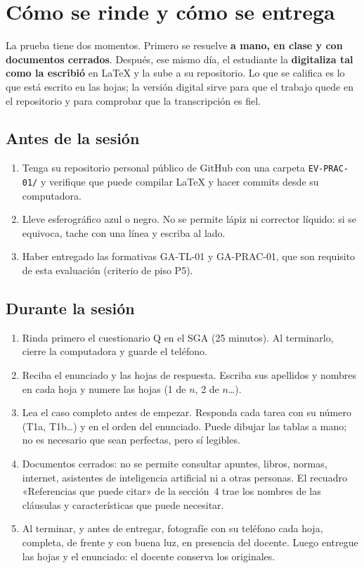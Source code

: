 \documentclass[11pt]{article}
\newcommand{\seccion}[1]{\section{\textcolor{utegreendk}{#1}}}
\newcommand{\subseccion}[1]{\subsection{\textcolor{midblue}{#1}}}
\begin{document}
\seccion{Cómo se rinde y cómo se entrega}

La prueba tiene dos momentos. Primero se resuelve \textbf{a mano, en clase y con documentos cerrados}. Después, ese mismo día, el estudiante la \textbf{digitaliza tal como la escribió} en \LaTeX{} y la sube a su repositorio. Lo que se califica es lo que está escrito en las hojas; la versión digital sirve para que el trabajo quede en el repositorio y para comprobar que la transcripción es fiel.

\subseccion{Antes de la sesión}

\begin{enumerate}[leftmargin=18pt,itemsep=2pt]
	\item Tenga su repositorio personal público de GitHub con una carpeta \texttt{EV-PRAC-01/} y verifique que puede compilar \LaTeX{} y hacer commits desde su computadora.
	\item Lleve esferográfico azul o negro. No se permite lápiz ni corrector líquido: si se equivoca, tache con una línea y escriba al lado.
	\item Haber entregado las formativas GA-TL-01 y GA-PRAC-01, que son requisito de esta evaluación (criterio de piso P5).
\end{enumerate}

\subseccion{Durante la sesión}

\begin{enumerate}[leftmargin=18pt,itemsep=2pt]
	\item Rinda primero el cuestionario Q en el SGA (25 minutos). Al terminarlo, cierre la computadora y guarde el teléfono.
	\item Reciba el enunciado y las hojas de respuesta. Escriba sus apellidos y nombres en cada hoja y numere las hojas (1 de $n$, 2 de $n$\ldots).
	\item Lea el caso completo antes de empezar. Responda cada tarea con su número (T1a, T1b\ldots) y en el orden del enunciado. Puede dibujar las tablas a mano; no es necesario que sean perfectas, pero sí legibles.
	\item Documentos cerrados: no se permite consultar apuntes, libros, normas, internet, asistentes de inteligencia artificial ni a otras personas. El recuadro «Referencias que puede citar» de la sección~4 trae los nombres de las cláusulas y características que puede necesitar.
	\item Al terminar, y antes de entregar, fotografíe con su teléfono cada hoja, completa, de frente y con buena luz, en presencia del docente. Luego entregue las hojas y el enunciado: el docente conserva los originales.
\end{enumerate}
\end{document}
